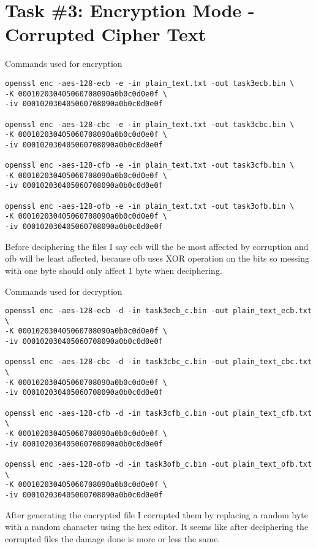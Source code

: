 \documentclass[11pt,letterpaper]{article}
\begin{document}
\section*{Task \#3: Encryption Mode - Corrupted Cipher Text}
\label{sec:org7d0dd8e}

Commands used for encryption
\lstset{language=sh,label= ,caption= ,captionpos=b,numbers=none}
\begin{lstlisting}
openssl enc -aes-128-ecb -e -in plain_text.txt -out task3ecb.bin \
-K 000102030405060708090a0b0c0d0e0f \
-iv 000102030405060708090a0b0c0d0e0f

openssl enc -aes-128-cbc -e -in plain_text.txt -out task3cbc.bin \
-K 000102030405060708090a0b0c0d0e0f \
-iv 000102030405060708090a0b0c0d0e0f

openssl enc -aes-128-cfb -e -in plain_text.txt -out task3cfb.bin \
-K 000102030405060708090a0b0c0d0e0f \
-iv 000102030405060708090a0b0c0d0e0f

openssl enc -aes-128-ofb -e -in plain_text.txt -out task3ofb.bin \
-K 000102030405060708090a0b0c0d0e0f \
-iv 000102030405060708090a0b0c0d0e0f
\end{lstlisting}

Before deciphering the files I say ecb will the be most affected by corruption and ofb will be least
affected, because ofb uses XOR operation on the bits so messing with one byte should only affect 1
byte when deciphering.

Commands used for decryption
\lstset{language=sh,label= ,caption= ,captionpos=b,numbers=none}
\begin{lstlisting}
openssl enc -aes-128-ecb -d -in task3ecb_c.bin -out plain_text_ecb.txt \
-K 000102030405060708090a0b0c0d0e0f \
-iv 000102030405060708090a0b0c0d0e0f

openssl enc -aes-128-cbc -d -in task3cbc_c.bin -out plain_text_cbc.txt \
-K 000102030405060708090a0b0c0d0e0f \
-iv 000102030405060708090a0b0c0d0e0f

openssl enc -aes-128-cfb -d -in task3cfb_c.bin -out plain_text_cfb.txt \
-K 000102030405060708090a0b0c0d0e0f \
-iv 000102030405060708090a0b0c0d0e0f

openssl enc -aes-128-ofb -d -in task3ofb_c.bin -out plain_text_ofb.txt \
-K 000102030405060708090a0b0c0d0e0f \
-iv 000102030405060708090a0b0c0d0e0f
\end{lstlisting}

After generating the encrypted file I corrupted them by replacing a random byte with a random
character using the hex editor. It seems like after deciphering the corrupted files the damage done
is more or less the same.
\end{document}
